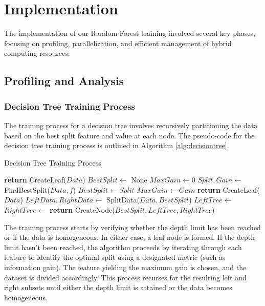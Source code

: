 \documentclass[13pt]{article}
\begin{document}
\newpage
\section{Implementation}
The implementation of our Random Forest training involved several key phases, focusing on profiling, parallelization, and efficient management of hybrid computing resources:

\subsection{Profiling and Analysis}

\subsubsection{Decision Tree Training Process}
The training process for a decision tree involves recursively partitioning the data based on the best split feature and value at each node.
The pseudo-code for the decision tree training process is outlined in Algorithm \ref{alg:decisiontree}.

\begin{algorithm}[ht]
    \caption{Decision Tree Training Process}\label{alg:decisiontree}
    \begin{algorithmic}[1]
            \State \textbf{return} CreateLeaf($Data$)
        \EndIf
        \State $BestSplit \gets$ None
        \State $MaxGain \gets 0$
            \State $Split, Gain \gets$ FindBestSplit($Data, f$)
                \State $BestSplit \gets Split$
                \State $MaxGain \gets Gain$
            \EndIf
        \EndFor
            \State \textbf{return} CreateLeaf($Data$)
        \EndIf
        \State $LeftData, RightData \gets$ SplitData($Data, BestSplit$)
        \State $LeftTree \gets$ 
        \State $RightTree \gets$ 
        \State \textbf{return} CreateNode($BestSplit, LeftTree, RightTree$)
    \EndProcedure
    \end{algorithmic}
\end{algorithm}

The training process starts by verifying whether the depth limit has been reached or if the data is homogeneous. In either case, a leaf node is formed. If the depth limit hasn't been reached, the algorithm proceeds by iterating through each feature to identify the optimal split using a designated metric (such as information gain). The feature yielding the maximum gain is chosen, and the dataset is divided accordingly. This process recurses for the resulting left and right subsets until either the depth limit is attained or the data becomes homogeneous.
\end{document}
